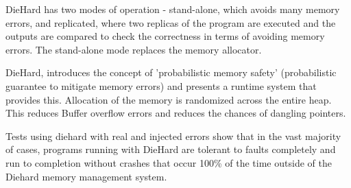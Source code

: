 \documentclass[twoside]{article}
\begin{document}
DieHard has two modes of operation - stand-alone, which avoids many memory errors, and replicated, where two replicas of the program are executed and the outputs are compared to check the correctness in terms of avoiding memory errors.
The stand-alone mode replaces the memory allocator.

DieHard, introduces the concept of 'probabilistic memory safety' (probabilistic guarantee to mitigate memory errors) and presents a runtime system that provides this. Allocation of the memory is randomized across the entire heap. This reduces Buffer overflow errors and reduces the chances of dangling pointers.

Tests using diehard with real and injected errors show that in the vast majority of cases, programs running with DieHard are tolerant to faults completely and run to completion without crashes that occur 100\% of the time outside of the Diehard memory management system. 




\end{document}
